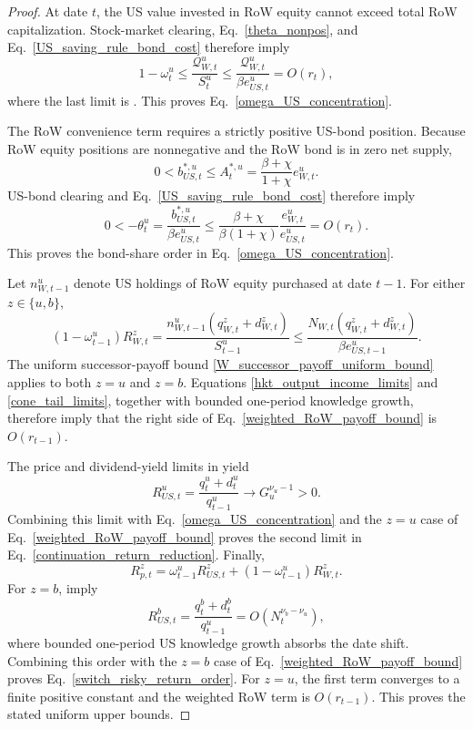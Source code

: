 \documentclass{article}
\def\green#1{#1}%
\begin{document}
\begin{proof}
At date $t$, the US value invested in RoW equity cannot exceed total RoW capitalization.  Stock-market clearing, Eq.~\eqref{theta_nonpos}, and Eq.~\eqref{US_saving_rule_bond_cost} therefore imply
\[
1-\omega_t^u
\le
\frac{\mathcal Q_{W,t}^u}{S_t^u}
\le
\frac{\mathcal Q_{W,t}^u}{\beta e_{US,t}^u}
\green{=O}(\green{r}_\green{t}),
\]
where the last limit is .  This proves Eq.~\eqref{omega_US_concentration}.

The RoW convenience term requires a strictly positive US-bond position.  Because RoW equity positions are nonnegative and the RoW bond is in zero net supply,
\[
0<b_{US,t}^{*,u}\le A_t^{*,u}
=
\frac{\beta+\chi}{1+\chi}e_{W,t}^u.
\]
US-bond clearing and Eq.~\eqref{US_saving_rule_bond_cost} therefore imply
\[
0<-\theta_t^u
=
\frac{b_{US,t}^{*,u}}{\beta e_{US,t}^u}
\le
\frac{\beta+\chi}{\beta(1+\chi)}
\frac{e_{W,t}^u}{e_{US,t}^u}
\green{=O}(\green{r}_\green{t}).
\]
This proves the \green{bond-share order} in Eq.~\eqref{omega_US_concentration}.

Let $n_{W,t-1}^u$ denote US holdings of RoW equity purchased at date $t-1$.  For either $z\in\{u,b\}$,
\begin{equation}\label{weighted_RoW_payoff_bound}
(1-\omega_{t-1}^u)R_{W,t}^z
=
\frac{n_{W,t-1}^u(q_{W,t}^z+d_{W,t}^z)}{S_{t-1}^u}
\le
\frac{N_{W,t}(q_{W,t}^z+d_{W,t}^z)}{\beta e_{US,t-1}^u}.
\end{equation}
The uniform successor-payoff bound \eqref{W_successor_payoff_uniform_bound} applies to both $z=u$ and $z=b$.  Equations \eqref{hkt_output_income_limits} and \eqref{cone_tail_limits}, together with bounded one-period knowledge growth, therefore imply that the right side of Eq.~\eqref{weighted_RoW_payoff_bound} \green{is} $\green{O}(\green{r}_{\green{t-1}})$.

The price and dividend-yield limits in  yield
\[
R_{US,t}^u
=
\frac{q_t^u+d_t^u}{q_{t-1}^u}
\longrightarrow G_u^{\nu_u-1}>0.
\]
Combining this limit with Eq.~\eqref{omega_US_concentration} and the $z=u$ case of Eq.~\eqref{weighted_RoW_payoff_bound} proves the second limit in Eq.~\eqref{continuation_return_reduction}.  Finally,
\[
R_{p,t}^z
=
\omega_{t-1}^uR_{US,t}^z
+(1-\omega_{t-1}^u)R_{W,t}^z.
\]
\green{For} $\green{z=b}$, \green{ imply}
\[
\green{R}_{\green{US},\green{t}}^\green{b}
\green{=}
\frac{\green{q}_\green{t}^\green{b+d}_\green{t}^\green{b}}{\green{q}_{\green{t-1}}^\green{u}}
\green{=O}(\green{N}_\green{t}^{\green{\nu}_\green{b-\nu}_\green{u}}),
\]
\green{where bounded one-period US knowledge growth absorbs the date shift}.  \green{Combining this} order \green{with} the $\green{z=b}$ \green{case of} Eq.~\eqref{weighted_RoW_payoff_bound} \green{proves Eq}.~\green{\eqref{switch_risky_return_order}}.  \green{For} $\green{z=u}$, \green{the first term converges to a finite} positive \green{constant} and the \green{weighted RoW term is} $\green{O}(\green{r}_{\green{t-1}})$.  This proves the \green{stated} uniform upper bounds.
\end{proof}
\end{document}
